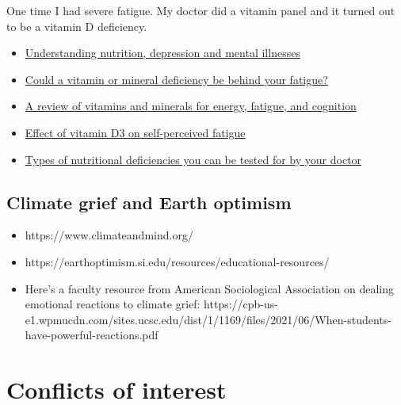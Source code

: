 \documentclass[
  letterpaper,
  DIV=11,
  numbers=noendperiod]{scrreprt}
\begin{document}
One time I had severe fatigue. My doctor did a vitamin panel and it
turned out to be a vitamin D deficiency.

\begin{itemize}
\item
  \href{https://www.ncbi.nlm.nih.gov/pmc/articles/PMC2738337/}{Understanding
  nutrition, depression and mental illnesses}
\item
  \href{https://www.health.harvard.edu/mind-and-mood/could-a-vitamin-or-mineral-deficiency-be-behind-your-fatigue}{Could
  a vitamin or mineral deficiency be behind your fatigue?}
\item
  \href{https://www.ncbi.nlm.nih.gov/pmc/articles/PMC7019700/}{A review
  of vitamins and minerals for energy, fatigue, and cognition}
\item
  \href{https://www.ncbi.nlm.nih.gov/pmc/articles/PMC5207540/}{Effect of
  vitamin D3 on self-perceived fatigue}
\item
  \href{https://www.myonemedicalsource.com/2020/06/18/nutritional-testing/}{Types
  of nutritional deficiencies you can be tested for by your doctor}
\end{itemize}

\hypertarget{climate-grief-and-earth-optimism}{%
\subsection*{\texorpdfstring{\textbf{Climate grief and Earth
optimism}}{Climate grief and Earth optimism}}\label{climate-grief-and-earth-optimism}}

\begin{itemize}
\item
  https://www.climateandmind.org/
\item
  https://earthoptimism.si.edu/resources/educational-resources/
\item
  Here's a faculty resource from American Sociological Association on
  dealing emotional reactions to climate grief:
  https://cpb-us-e1.wpmucdn.com/sites.ucsc.edu/dist/1/1169/files/2021/06/When-students-have-powerful-reactions.pdf
\end{itemize}

\hypertarget{conflicts-of-interest}{%
\section*{\texorpdfstring{\textbf{Conflicts of
interest}}{Conflicts of interest}}\label{conflicts-of-interest}}
\end{document}
